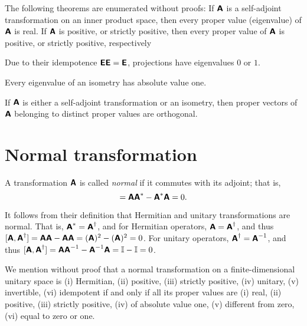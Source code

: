 The following theorems are enumerated without proofs:
If $\textsf{\textbf{A}}$
is a self-adjoint transformation on an inner product space, then every proper value (eigenvalue)  of $\textsf{\textbf{A}}$
is real.
If $\textsf{\textbf{A}}$ is positive, or strictly positive,
then every proper value of  $\textsf{\textbf{A}}$ is positive, or strictly positive, respectively

Due to their idempotence $\textsf{\textbf{E}}\textsf{\textbf{E}}=\textsf{\textbf{E}}$,
projections have eigenvalues $0$ or $1$.

Every eigenvalue of an isometry has absolute value one.

If  $\textsf{\textbf{A}}$  is either a self-adjoint transformation or an isometry,
then proper vectors of $ \textsf{\textbf{A}}$
belonging to distinct proper values are orthogonal.


\section{Normal transformation}
\label{2014-m-fdvs-normality}

A transformation $\textsf{\textbf{A}}$ is called {\em normal}
if it commutes with its adjoint; that is,
\begin{equation}
[\textsf{\textbf{A}},\textsf{\textbf{A}}^\ast ]= \textsf{\textbf{A}}\textsf{\textbf{A}}^\ast  -
\textsf{\textbf{A}}^\ast  \textsf{\textbf{A}} =0.
\end{equation}


It follows from their definition that Hermitian and unitary transformations are normal. That is,
$\textsf{\textbf{A}}^\ast =\textsf{\textbf{A}}^\dagger$,
and for Hermitian operators,
$\textsf{\textbf{A}}=\textsf{\textbf{A}}^\dagger$,
and thus
$[\textsf{\textbf{A}},\textsf{\textbf{A}}^\dagger]= \textsf{\textbf{A}}\textsf{\textbf{A}} -
\textsf{\textbf{A}} \textsf{\textbf{A}} =(\textsf{\textbf{A}})^2 -(\textsf{\textbf{A}})^2=0$.
For unitary operators,
$\textsf{\textbf{A}}^\dagger =\textsf{\textbf{A}}^{-1}$,
and thus
$[\textsf{\textbf{A}},\textsf{\textbf{A}}^\dagger]= \textsf{\textbf{A}}\textsf{\textbf{A}}^{-1} -
\textsf{\textbf{A}}^{-1} \textsf{\textbf{A}} ={\Bbb I} -{\Bbb I} =0$.


We mention without proof that
a normal transformation on a finite-dimensional unitary space is
(i) Hermitian,
(ii) positive,
(iii) strictly positive,
(iv) unitary,
(v) invertible,
(vi) idempotent
if and only if all its proper values are
(i) real,
(ii) positive,
(iii) strictly positive,
(iv) of absolute value one,
(v) different from zero,
(vi) equal to zero or one.

